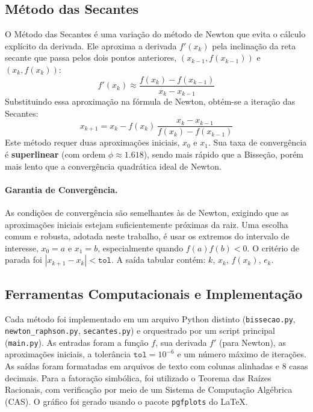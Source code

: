 \documentclass[12pt,a4paper]{article}
\begin{document}
\subsection{Método das Secantes}
O Método das Secantes é uma variação do método de Newton que evita o cálculo explícito da derivada. Ele aproxima a derivada $f'(x_k)$ pela inclinação da reta secante que passa pelos dois pontos anteriores, $(x_{k-1}, f(x_{k-1}))$ e $(x_k, f(x_k))$:
\[
f'(x_k) \approx \frac{f(x_k) - f(x_{k-1})}{x_k - x_{k-1}}
\]
Substituindo essa aproximação na fórmula de Newton, obtém-se a iteração das Secantes:
\[
x_{k+1} = x_k - f(x_k)\,\frac{x_k - x_{k-1}}{f(x_k) - f(x_{k-1})}
\]
Este método requer duas aproximações iniciais, $x_0$ e $x_1$. Sua taxa de convergência é \textbf{superlinear} (com ordem $\phi \approx 1.618$), sendo mais rápido que a Bisseção, porém mais lento que a convergência quadrática ideal de Newton.

\paragraph{Garantia de Convergência.} As condições de convergência são semelhantes às de Newton, exigindo que as aproximações iniciais estejam suficientemente próximas da raiz. Uma escolha comum e robusta, adotada neste trabalho, é usar os extremos do intervalo de interesse, $x_0 = a$ e $x_1 = b$, especialmente quando $f(a)f(b) < 0$. O critério de parada foi $|x_{k+1}-x_k| < \texttt{tol}$. A saída tabular contém: $k$, $x_k$, $f(x_k)$, $e_k$.

\subsection{Ferramentas Computacionais e Implementação}
Cada método foi implementado em um arquivo Python distinto (\texttt{bissecao.py}, \texttt{newton\_raphson.py}, \texttt{secantes.py}) e orquestrado por um script principal (\texttt{main.py}). As entradas foram a função $f$, sua derivada $f'$ (para Newton), as aproximações iniciais, a tolerância $\texttt{tol}=10^{-6}$ e um número máximo de iterações. As saídas foram formatadas em arquivos de texto com colunas alinhadas e 8 casas decimais. Para a fatoração simbólica, foi utilizado o Teorema das Raízes Racionais, com verificação por meio de um Sistema de Computação Algébrica (CAS). O gráfico foi gerado usando o pacote \texttt{pgfplots} do LaTeX.
\end{document}
